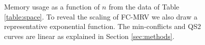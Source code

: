 \begin{figure}[htpb]
\centering
{}
\caption{Memory usage as a function of $n$ from the data of Table \ref{table:space}. To reveal the scaling of FC-MRV we also draw a representative exponential function. The min-conflicts and QS2 curves are linear as explained in Section \ref{sec:methods}.}
\label{fig:space}
\end{figure} %